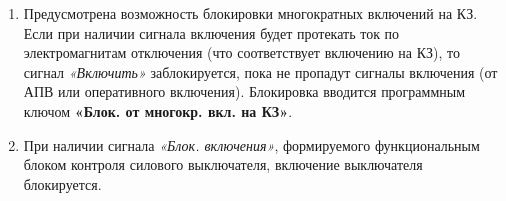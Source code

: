 \begin{enumerate}
\item
Предусмотрена возможность блокировки многократных включений на КЗ. Если при наличии сигнала
включения будет протекать ток по электромагнитам отключения (что соответствует включению на КЗ), то
сигнал \textit{«Включить»} заблокируется, пока не пропадут сигналы включения (от АПВ или оперативного
включения). Блокировка вводится программным ключом \textbf{«Блок. от многокр. вкл. на КЗ»}.

\item
При наличии сигнала \textit{«Блок. включения»}, формируемого функциональным блоком контроля силового
выключателя, включение выключателя блокируется.

\end{enumerate}